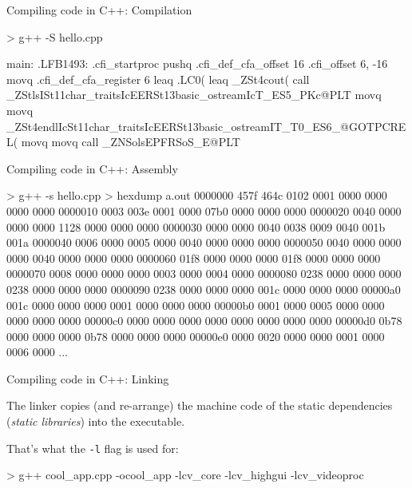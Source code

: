 \documentclass[compress]{beamer}
\begin{document}
\begin{frame}[fragile]{Compiling code in C++: Compilation}

\begin{shcode}
> g++ -S hello.cpp
\end{shcode}


\begin{asmcode}
main:
.LFB1493:
	.cfi_startproc
	pushq	%
	.cfi_def_cfa_offset 16
	.cfi_offset 6, -16
	movq	%
	.cfi_def_cfa_register 6
	leaq	.LC0(%
	leaq	_ZSt4cout(%
	call	_ZStlsISt11char_traitsIcEERSt13basic_ostreamIcT_ES5_PKc@PLT
	movq	%
	movq	_ZSt4endlIcSt11char_traitsIcEERSt13basic_ostreamIT_T0_ES6_@GOTPCREL(%
	movq	%
	movq	%
	call	_ZNSolsEPFRSoS_E@PLT
\end{asmcode}
\end{frame}

\begin{frame}[fragile]{Compiling code in C++: Assembly}

\begin{shcode}
> g++ -s hello.cpp
> hexdump a.out
0000000 457f 464c 0102 0001 0000 0000 0000 0000
0000010 0003 003e 0001 0000 07b0 0000 0000 0000
0000020 0040 0000 0000 0000 1128 0000 0000 0000
0000030 0000 0000 0040 0038 0009 0040 001b 001a
0000040 0006 0000 0005 0000 0040 0000 0000 0000
0000050 0040 0000 0000 0000 0040 0000 0000 0000
0000060 01f8 0000 0000 0000 01f8 0000 0000 0000
0000070 0008 0000 0000 0000 0003 0000 0004 0000
0000080 0238 0000 0000 0000 0238 0000 0000 0000
0000090 0238 0000 0000 0000 001c 0000 0000 0000
00000a0 001c 0000 0000 0000 0001 0000 0000 0000
00000b0 0001 0000 0005 0000 0000 0000 0000 0000
00000c0 0000 0000 0000 0000 0000 0000 0000 0000
00000d0 0b78 0000 0000 0000 0b78 0000 0000 0000
00000e0 0000 0020 0000 0000 0001 0000 0006 0000
...
\end{shcode}
\end{frame}

\begin{frame}[fragile]{Compiling code in C++: Linking}

The linker copies (and re-arrange) the machine code of the static dependencies
(\emph{static libraries}) into the executable.

That's what the \texttt{-l} flag is used for:

\begin{shcode}
> g++ cool_app.cpp -ocool_app -lcv_core -lcv_highgui -lcv_videoproc
\end{shcode}

\end{frame}
\end{document}
